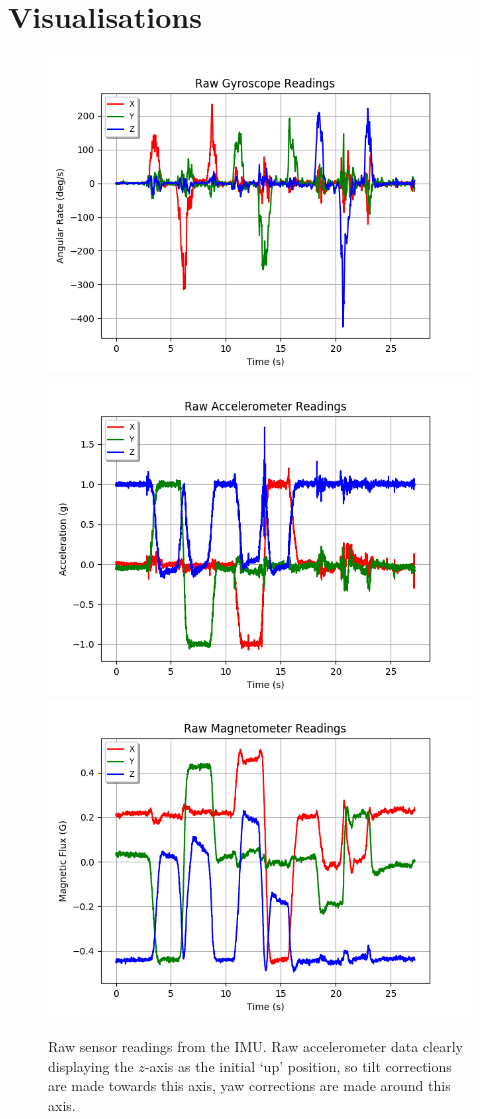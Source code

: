 \documentclass[11pt]{article}
\begin{document}
\section*{Visualisations}

\begin{figure}[htp]

\centering
\includegraphics[width=.32\textwidth]{gyro-unaltered}\hfill
\includegraphics[width=.32\textwidth]{acc-unaltered}\hfill
\includegraphics[width=.32\textwidth]{mag-unaltered}

\caption{Raw sensor readings from the IMU. Raw accelerometer data clearly displaying the $z$-axis as the initial `up' position, so tilt corrections are made towards this axis, yaw corrections are made around this axis.}
\label{fig:raw-readings}

\end{figure}
\end{document}
